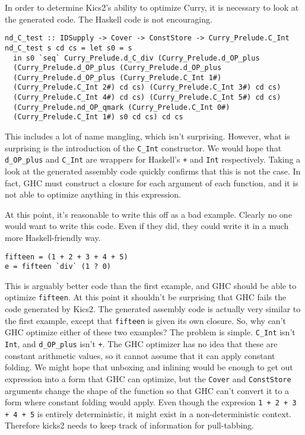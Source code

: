 In order to determine Kics2's ability to optimize Curry, it is necessary to look at the generated code.
The Haskell code is not encouraging.

\begin{verbatim}
nd_C_test :: IDSupply -> Cover -> ConstStore -> Curry_Prelude.C_Int
nd_C_test s cd cs = let s0 = s
  in s0 `seq` Curry_Prelude.d_C_div (Curry_Prelude.d_OP_plus
  (Curry_Prelude.d_OP_plus (Curry_Prelude.d_OP_plus 
  (Curry_Prelude.d_OP_plus (Curry_Prelude.C_Int 1#)
  (Curry_Prelude.C_Int 2#) cd cs) (Curry_Prelude.C_Int 3#) cd cs) 
  (Curry_Prelude.C_Int 4#) cd cs) (Curry_Prelude.C_Int 5#) cd cs) 
  (Curry_Prelude.nd_OP_qmark (Curry_Prelude.C_Int 0#) 
  (Curry_Prelude.C_Int 1#) s0 cd cs) cd cs
\end{verbatim}

This includes a lot of name mangling, which isn't surprising.
However, what is surprising is the introduction of the \texttt{C\_Int} constructor.
We would hope that \texttt{d\_OP\_plus} and \texttt{C\_Int} 
are wrappers for Haskell's \texttt{+} and \texttt{Int} respectively.
Taking a look at the generated assembly code quickly confirms that this is not the case.
In fact, GHC must construct a closure for each argument of each function, and it is not able to optimize anything in this expression.

At this point, it's reasonable to write this off as a bad example.  Clearly no one would want to write this code.
Even if they did, they could write it in a much more Haskell-friendly way.

\begin{verbatim}
fifteen = (1 + 2 + 3 + 4 + 5)
e = fifteen `div` (1 ? 0)
\end{verbatim}

This is arguably better code than the first example, and GHC should be able to optimize \texttt{fifteen}.
At this point it shouldn't be surprising that GHC fails the code generated by Kics2.
The generated assembly code is actually very similar to the first example, except that \texttt{fifteen}
is given its own closure.
So, why can't GHC optimize either of these two examples?
The problem is simple.  \texttt{C\_Int} isn't \texttt{Int}, and \texttt{d\_OP\_plus} isn't \texttt{+}.
The GHC optimizer has no idea that these are constant arithmetic values, so it
cannot assume that it can apply constant folding.
We might hope that unboxing and inlining would be enough to get out expression into a form
that GHC can optimize, but the \texttt{Cover} and \texttt{ConstStore} arguments 
change the shape of the function so that GHC can't convert it to a form where constant folding would apply.
Even though the expresion \texttt{1 + 2 + 3 + 4 + 5} is entirely deterministic, it might exist
in a non-deterministic context.
Therefore kicks2 needs to keep track of information for pull-tabbing.

